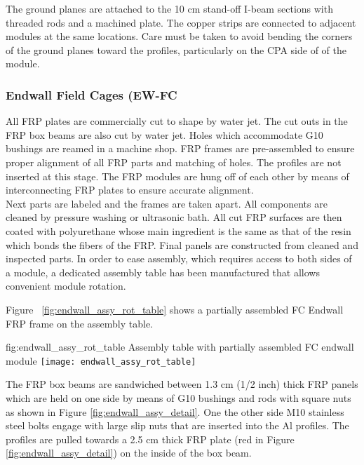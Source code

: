 The ground planes are attached to the 10 cm stand-off I-beam sections with threaded rods and a machined plate. The copper strips are connected to adjacent modules at the same locations. Care must be taken to avoid bending the corners of the ground planes toward the profiles, particularly on the CPA side of of the module.

\subsubsection{Endwall Field Cages (EW-FC}

All FRP plates are commercially cut to shape by water jet. The cut outs in the FRP box beams are also cut by water jet. Holes which accommodate G10 bushings are reamed in a machine shop. FRP frames are pre-assembled to ensure proper alignment of all FRP parts and matching of holes. The profiles are not inserted at this stage. The FRP modules are hung off of each other by means of interconnecting FRP plates to ensure accurate alignment.\\

Next  parts are labeled and the frames are taken apart. All components are cleaned by pressure washing or ultrasonic bath. All cut FRP surfaces are then coated with polyurethane whose main ingredient is the same as that of the resin which bonds
the fibers of the FRP. Final panels are constructed from cleaned and inspected parts. In order to ease assembly, which requires access to both sides of a module,
a dedicated assembly table has been manufactured that allows convenient module rotation. 

Figure ~\ref{fig:endwall_assy_rot_table} shows a partially assembled FC Endwall FRP frame on the assembly table.

\begin{dunefigure}{fig:endwall_assy_rot_table}{ Assembly table with partially assembled FC endwall module}
 \texttt{[image: endwall\_assy\_rot\_table]}
 \end{dunefigure}
 
The FRP box beams are sandwiched between 1.3 cm (1/2 inch) thick FRP panels which are held on one side by means of G10 bushings and rods with square nuts
as shown in Figure \ref{fig:endwall_assy_detail}. One the other side M10 stainless steel bolts engage with large slip nuts that are inserted into the Al profiles. The profiles 
are pulled towards a 2.5 cm thick FRP plate (red in Figure \ref{fig:endwall_assy_detail}) on the inside of the box beam.

